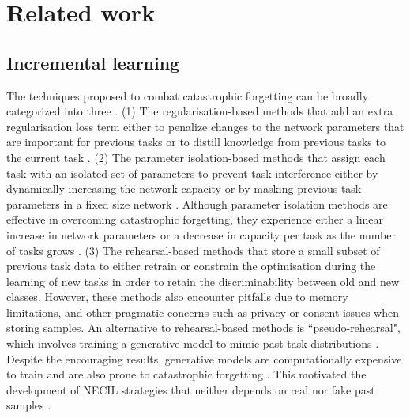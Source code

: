 \documentclass[10pt,twocolumn,letterpaper]{article}
\begin{document}
\section{Related work}
\subsection{Incremental learning}

The techniques proposed to combat catastrophic forgetting can be broadly categorized into three \cite{DeLange2021ATasks}. 
(1) The regularisation-based methods that add an extra regularisation loss term either to penalize changes to the network parameters that are important for previous tasks \cite{Kirkpatrick2017OvercomingNetworks, Liu2018RotateForgetting, Zenke2017ContinualIntelligence, Aljundi2018MemoryForget} or to distill knowledge from previous tasks to the current task \cite{Li2018LearningForgetting, Dhar2019LearningMemorizing,Zhang2020Class-incrementalConsolidation}. (2) The parameter isolation-based methods that assign each task with an isolated set of  parameters to prevent task interference either by dynamically increasing the network capacity \cite{Rusu2016ProgressiveNetworks,Yoon2017LifelongNetworks, Aljundi2017ExpertExperts} or by masking previous task parameters in a fixed size network \cite{Fernando2017Pathnet:Networks, Serra2018OvercomingTask,Mallya2018Packnet:Pruning}. Although parameter isolation methods are effective in overcoming catastrophic forgetting, they experience either a linear increase in network parameters or a decrease in capacity per task as the number of tasks grows \cite{Smith2021AlwaysLearning}. (3) The rehearsal-based methods that store a small subset of previous task data to either retrain \cite{Lampert2017,Castro2018End-to-endLearning,Chaudhry2019OnLearning} or constrain the optimisation \cite{NIPS2017_f8752278,Chaudhry2019EfficientA-gem,Aljundi2019GradientLearning} during the learning of new tasks in order to retain the discriminability between old and new classes. However, these methods also encounter pitfalls due to memory limitations, and other pragmatic concerns such as privacy or consent issues when storing samples.
An alternative to rehearsal-based methods is ``pseudo-rehearsal", which involves training a generative model to mimic past task distributions \cite{Shin2017,Seff2017ContinualNets}. Despite the encouraging results, generative models are computationally expensive to train \cite{deVen2018GenerativeLearning} and are also prone to catastrophic forgetting \cite{Thanh-Tung2020CatastrophicGans}. This motivated the development of NECIL strategies that neither depends on real nor fake past samples \cite{Zhu2021PrototypeLearning,Zhu2022Self-SustainingLearning,Liu2020MoreLearning,Yu2020}.
\end{document}
